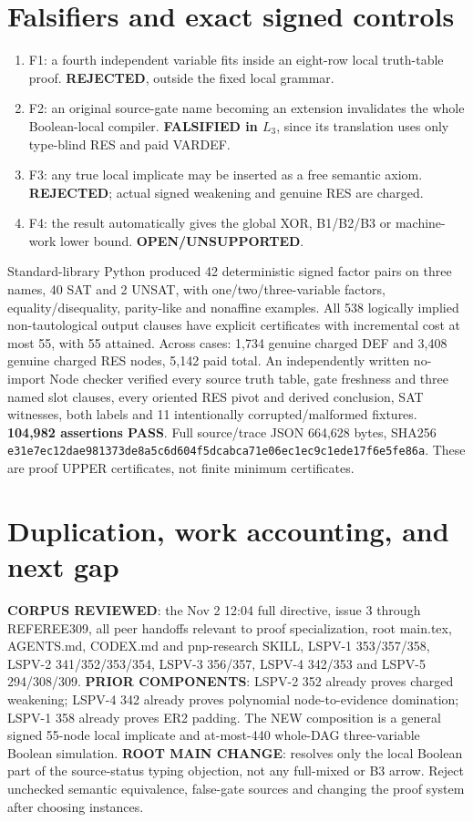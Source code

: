 \documentclass[11pt]{article}
\begin{document}
\section*{Falsifiers and exact signed controls}
\begin{enumerate}
\item[] F1: a fourth independent variable fits inside an eight-row local truth-table proof. \textbf{REJECTED}, outside the fixed local grammar.
\item[] F2: an original source-gate name becoming an extension invalidates the whole Boolean-local compiler. \textbf{FALSIFIED in \(L_3\)}, since its translation uses only type-blind RES and paid VARDEF.
\item[] F3: any true local implicate may be inserted as a free semantic axiom. \textbf{REJECTED}; actual signed weakening and genuine RES are charged.
\item[] F4: the result automatically gives the global XOR, B1/B2/B3 or machine-work lower bound. \textbf{OPEN/UNSUPPORTED}.
\end{enumerate}
Standard-library Python produced 42 deterministic signed factor pairs on three names, 40 SAT and 2 UNSAT, with one/two/three-variable factors, equality/disequality, parity-like and nonaffine examples. All 538 logically implied non-tautological output clauses have explicit certificates with incremental cost at most 55, with 55 attained. Across cases: 1,734 genuine charged DEF and 3,408 genuine charged RES nodes, 5,142 paid total. An independently written no-import Node checker verified every source truth table, gate freshness and three named slot clauses, every oriented RES pivot and derived conclusion, SAT witnesses, both labels and 11 intentionally corrupted/malformed fixtures. \textbf{104,982 assertions PASS}. Full source/trace JSON 664,628 bytes, SHA256 \texttt{e31e7ec12dae981373de8a5c6d604f5dcabca71e06ec1ec9c1ede17f6e5fe86a}. These are proof UPPER certificates, not finite minimum certificates.

\section*{Duplication, work accounting, and next gap}
\textbf{CORPUS REVIEWED}: the Nov 2 12:04 full directive, issue 3 through REFEREE309, all peer handoffs relevant to proof specialization, root main.tex, AGENTS.md, CODEX.md and pnp-research SKILL, LSPV-1 353/357/358, LSPV-2 341/352/353/354, LSPV-3 356/357, LSPV-4 342/353 and LSPV-5 294/308/309. \textbf{PRIOR COMPONENTS}: LSPV-2 352 already proves charged weakening; LSPV-4 342 already proves polynomial node-to-evidence domination; LSPV-1 358 already proves ER2 padding. The NEW composition is a general signed 55-node local implicate and at-most-440 whole-DAG three-variable Boolean simulation. \textbf{ROOT MAIN CHANGE}: resolves only the local Boolean part of the source-status typing objection, not any full-mixed or B3 arrow. Reject unchecked semantic equivalence, false-gate sources and changing the proof system after choosing instances.
\end{document}

